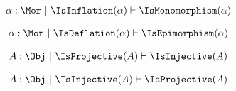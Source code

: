 \begin{sequent}
\begin{align*}
  \alpha:\Mor ~|~ \IsInflation( \alpha ) \vdash \IsMonomorphism( \alpha )
\end{align*}
\end{sequent}
\begin{sequent}
\begin{align*}
  \alpha:\Mor ~|~ \IsDeflation( \alpha ) \vdash \IsEpimorphism( \alpha )
\end{align*}
\end{sequent}
\begin{sequent}
\begin{align*}
  A:\Obj ~|~ \IsProjective( A ) \vdash \IsInjective( A )
\end{align*}
\end{sequent}
\begin{sequent}
\begin{align*}
  A:\Obj ~|~ \IsInjective( A ) \vdash \IsProjective( A )
\end{align*}
\end{sequent}

